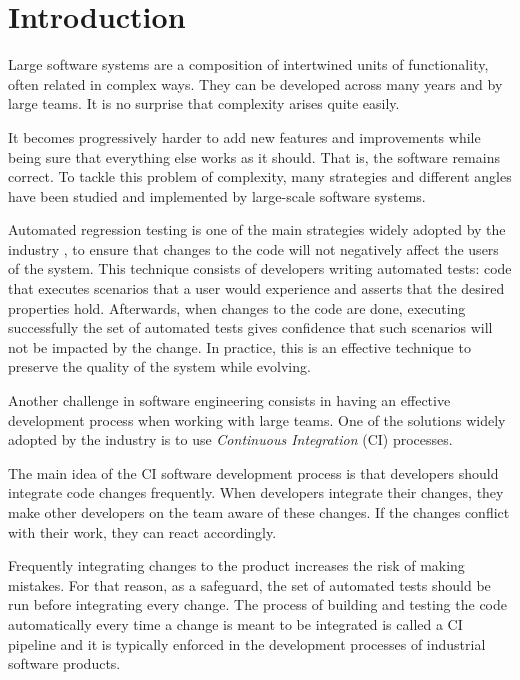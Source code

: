 \chapter{Introduction}\label{s:introduction}

Large software systems are a composition of intertwined units of functionality,
often related in complex ways. They can be developed across many years and by 
large teams. It is no surprise that complexity arises quite easily. 

It becomes progressively harder to add new features and improvements while being 
sure that everything else works as it should. That is, the software remains
correct. To tackle this problem of complexity, many strategies and different 
angles have been studied and implemented by large-scale software systems. 

Automated regression testing \cite{baresiregtest} is one of the main strategies widely adopted by the industry \cite{10.1007/s10606-009-9098-7},
to ensure that changes to the code will not negatively affect the users of the system. 
This technique consists of developers writing automated tests: code that executes scenarios that a user would experience
and asserts that the desired properties hold. Afterwards, when changes to the code are done,
executing successfully the set of automated tests gives confidence that such scenarios will
not be impacted by the change. In practice, this is an effective technique to preserve the quality of the system while
evolving. \cite{10.1007/s10606-009-9098-7}\cite{baresiregtest}

Another challenge in software engineering consists in having an effective development process when
working with large teams. One of the solutions widely adopted by the industry is to use \emph{Continuous Integration} (CI) processes.

The main idea of the CI software development process is that developers should 
integrate code changes frequently. When developers integrate their changes, 
they make other developers on the team aware of these changes. If the changes
 conflict with their work, they can react accordingly.

Frequently integrating changes to the product increases the risk of making mistakes.
For that reason, as a safeguard, the set of automated tests should be run before 
integrating every change. The process of building and testing the code automatically
every time a change is meant to be integrated is called a CI pipeline and it is typically
enforced in the development processes of industrial software products.

